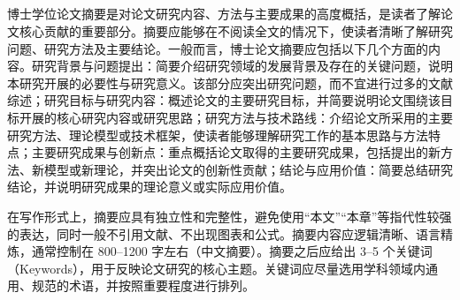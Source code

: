 


\begin{flushleft}
{\heiti
    \textbf{\the\CTitle}\\
    \textbf{\the\Cmajor}\\
    \textbf{\the\StudentAuthor}\hfill {}\thickuline{\quad\quad\quad\quad\quad\quad}\\
    \textbf{\the\Csupervisor~~\the\CsupervisorTitle}\hfill {}\thickuline{\quad\quad\quad\quad\quad\quad}\\
}
\end{flushleft}

\begin{cnabstract}
博士学位论文摘要是对论文研究内容、方法与主要成果的高度概括，是读者了解论文核心贡献的重要部分。摘要应能够在不阅读全文的情况下，使读者清晰了解研究问题、研究方法及主要结论。一般而言，博士论文摘要应包括以下几个方面的内容。研究背景与问题提出：简要介绍研究领域的发展背景及存在的关键问题，说明本研究开展的必要性与研究意义。该部分应突出研究问题，而不宜进行过多的文献综述；研究目标与研究内容：概述论文的主要研究目标，并简要说明论文围绕该目标开展的核心研究内容或研究思路；研究方法与技术路线：介绍论文所采用的主要研究方法、理论模型或技术框架，使读者能够理解研究工作的基本思路与方法特点；主要研究成果与创新点：重点概括论文取得的主要研究成果，包括提出的新方法、新模型或新理论，并突出论文的创新性贡献；结论与应用价值：简要总结研究结论，并说明研究成果的理论意义或实际应用价值。

在写作形式上，摘要应具有独立性和完整性，避免使用“本文”“本章”等指代性较强的表达，同时一般不引用文献、不出现图表和公式。摘要内容应逻辑清晰、语言精炼，通常控制在 800–1200 字左右（中文摘要）。摘要之后应给出 3–5 个关键词（Keywords），用于反映论文研究的核心主题。关键词应尽量选用学科领域内通用、规范的术语，并按照重要程度进行排列。

\par\vspace{\baselineskip}
\end{cnabstract}

